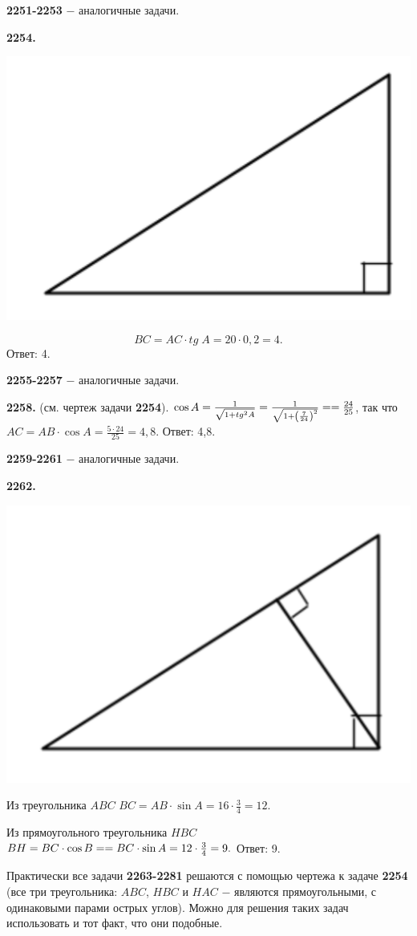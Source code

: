 \textbf{2251-2253} $-$ аналогичные задачи.

\textbf{2254.} 
 
{\centering \includegraphics[width=0.4\linewidth]{Geometry/Content/51.png}
	
}
\[
BC = AC\cdot tg\;A =20\cdot 0,2=4.
\] \null \hspace*{\fill} Ответ: 4.

\textbf{2255-2257} $-$ аналогичные задачи.

\textbf{2258.} (см. чертеж задачи \textbf{2254}). $\cos{A}=\frac{1}{\sqrt{1+tg^2A}}=\frac{1}{\sqrt{1 + \left( \frac{7}{24} \right)^2}} = \linebreak= \frac{24}{25}$,  
так что $AC=AB\cdot\cos{A}=\frac{5\cdot24}{25}=4,8.$ \newline \null \hspace*{\fill} Ответ: 4,8.

\textbf{2259-2261} $-$ аналогичные задачи.

\textbf{2262.}

{\centering \includegraphics[width=0.4\linewidth]{Geometry/Content/52.png}
	
}

Из треугольника $ABC$ $BC=AB\cdot\sin{A}=16\cdot\frac{3}{4}=12$.

Из прямоугольного треугольника $HBC$ $BH=BC\cdot\cos{B}=\linebreak=BC\cdot\sin{A}=12\cdot\frac{3}{4}=9.$ \newline \null \hspace*{\fill} Ответ: 9.

Практически все задачи \textbf{2263-2281} решаются с помощью чертежа к задаче \textbf{2254} (все три треугольника: $ABC$, $HBC$ и $HAC$ $-$ являются прямоугольными, с одинаковыми парами острых углов). Можно для решения таких задач использовать и тот факт, что они подобные. 

